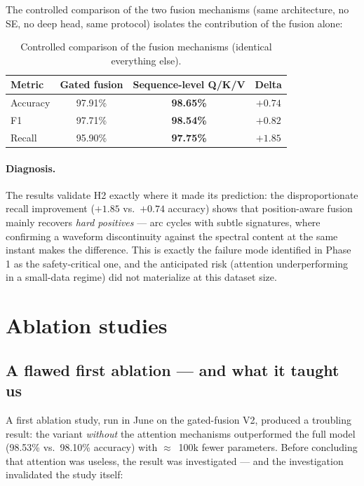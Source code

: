 \medskip

The controlled comparison of the two fusion mechanisms (same architecture, no SE, no deep head, same protocol) isolates the contribution of the fusion alone:

\begin{table}[H]
\centering
\caption{Controlled comparison of the fusion mechanisms (identical everything else).}
\label{tab:fusion-comparison}
\renewcommand{\arraystretch}{1.25}
\small
\begin{tabular}{|l|c|c|c|}
\hline
\textbf{Metric} & \textbf{Gated fusion} & \textbf{Sequence-level Q/K/V} & \textbf{Delta} \\
\hline
Accuracy & 97.91\% & \textbf{98.65\%} & $+0.74$ \\
\hline
F1 & 97.71\% & \textbf{98.54\%} & $+0.82$ \\
\hline
Recall & 95.90\% & \textbf{97.75\%} & $\mathbf{+1.85}$ \\
\hline
\end{tabular}
\end{table}

\paragraph{Diagnosis.} The results validate H2 exactly where it made its prediction: the disproportionate recall improvement ($+1.85$ vs.\ $+0.74$ accuracy) shows that position-aware fusion mainly recovers \emph{hard positives} --- arc cycles with subtle signatures, where confirming a waveform discontinuity against the spectral content at the same instant makes the difference. This is exactly the failure mode identified in Phase 1 as the safety-critical one, and the anticipated risk (attention underperforming in a small-data regime) did not materialize at this dataset size.

\section{Ablation studies}
\label{sec:ablation}

\subsection{A flawed first ablation --- and what it taught us}
\label{sec:flawed-ablation}

A first ablation study, run in June on the gated-fusion V2, produced a troubling result: the variant \emph{without} the attention mechanisms outperformed the full model (98.53\% vs.\ 98.10\% accuracy) with $\approx$~100k fewer parameters. Before concluding that attention was useless, the result was investigated --- and the investigation invalidated the study itself:

